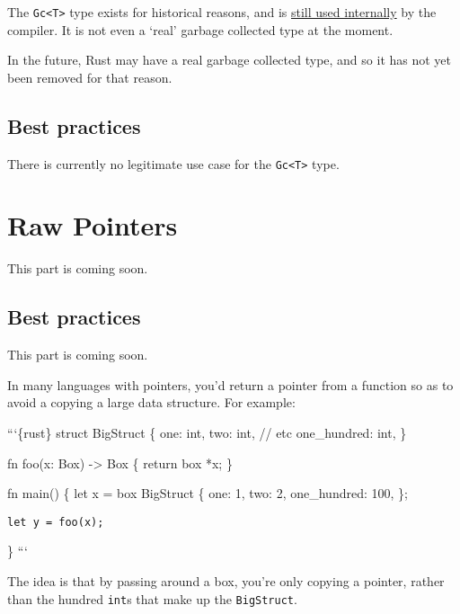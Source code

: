 \documentclass[]{article}
\begin{document}
The \texttt{Gc\textless{}T\textgreater{}} type exists for historical
reasons, and is
\href{https://github.com/rust-lang/rust/issues/7929}{still used
internally} by the compiler. It is not even a `real' garbage collected
type at the moment.

In the future, Rust may have a real garbage collected type, and so it
has not yet been removed for that reason.

\subsection{Best practices}\label{best-practices-3}

There is currently no legitimate use case for the
\texttt{Gc\textless{}T\textgreater{}} type.

\section{Raw Pointers}\label{raw-pointers}

This part is coming soon.

\subsection{Best practices}\label{best-practices-4}

This part is coming soon.


In many languages with pointers, you'd return a pointer from a function
so as to avoid a copying a large data structure. For example:

```\{rust\} struct BigStruct \{ one: int, two: int, // etc one\_hundred:
int, \}

fn foo(x: Box) -\textgreater{} Box \{ return box *x; \}

fn main() \{ let x = box BigStruct \{ one: 1, two: 2, one\_hundred: 100,
\};

\begin{verbatim}
let y = foo(x);
\end{verbatim}

\} ```

The idea is that by passing around a box, you're only copying a pointer,
rather than the hundred \texttt{int}s that make up the
\texttt{BigStruct}.
\end{document}
